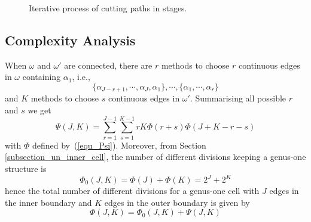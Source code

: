 \documentclass[conference]{IEEEtran}
\begin{document}
\begin{figure}[t]
\centering
{}
\caption{Iterative process of cutting paths in stages.}
\label{fig_equivalence}
\end{figure}

\subsection{Complexity Analysis}\label{subsection_genus_one_complexity}
When $\omega$ and $\omega'$ are connected, there are $r$ methods to choose $r$ continuous edges in $\omega$ containing $\alpha_1$, i.e., 
\begin{equation}
\{\alpha_{J-r+1}, \cdots, \alpha_J, \alpha_1\}, \cdots, \{\alpha_1, \cdots, \alpha_r\}
\end{equation}
and $K$ methods to choose $s$ continuous edges in $\omega'$. Summarising all possible $r$ and $s$ we get
\begin{equation}\label{equ_Psi_1}
\Psi(J, K) = \sum\limits_{r = 1}^{J-1}\sum\limits_{s = 1}^{K-1} rK\Phi(r+s)\Phi(J+K -r-s)
\end{equation}
with $\Phi$ defined by~(\ref{equ_Psi}). Moreover, from Section \ref{subsection_un_inner_cell}, the number of different divisions keeping a genus-one structure is 
\begin{equation}\label{equ_Phi_0}
\Phi_0(J, K) = \Phi(J) + \Phi(K) = 2^J + 2^K
\end{equation}
hence the total number of different divisions for a genus-one cell with $J$ edges in the inner boundary and $K$ edges in the outer boundary is given by
\begin{equation}
\Phi(J, K) = \Phi_0(J, K) + \Psi(J, K)
\end{equation}
\end{document}
